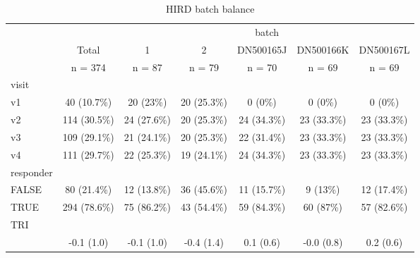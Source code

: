 \begin{table}[ ht ] 
 \centering 
 \caption{HIRD batch balance}\label{tab:hird_batch_balance}
 \begin{tabular}{ l c c c c c c }
 \toprule
  &   &  \multicolumn{ 5 }{c}{ batch }\\ 
   & Total & 1 & 2 & DN500165J & DN500166K & DN500167L \\ 
  & n = 374 & n = 87 & n = 79 & n = 70 & n = 69 & n = 69 \\ 
  \midrule
 visit &   &   &   &   &   &  \\ 
 \hspace{6pt}    v1 & 40 (10.7\%) & 20 (23\%) & 20 (25.3\%) & 0 (0\%) & 0 (0\%) & 0 (0\%)\\ 
 \hspace{6pt}    v2 & 114 (30.5\%) & 24 (27.6\%) & 20 (25.3\%) & 24 (34.3\%) & 23 (33.3\%) & 23 (33.3\%)\\ 
 \hspace{6pt}    v3 & 109 (29.1\%) & 21 (24.1\%) & 20 (25.3\%) & 22 (31.4\%) & 23 (33.3\%) & 23 (33.3\%)\\ 
 \hspace{6pt}    v4 & 111 (29.7\%) & 22 (25.3\%) & 19 (24.1\%) & 24 (34.3\%) & 23 (33.3\%) & 23 (33.3\%)\\ 
 responder &   &   &   &   &   &  \\ 
 \hspace{6pt}    FALSE & 80 (21.4\%) & 12 (13.8\%) & 36 (45.6\%) & 11 (15.7\%) & 9 (13\%) & 12 (17.4\%)\\ 
 \hspace{6pt}    TRUE & 294 (78.6\%) & 75 (86.2\%) & 43 (54.4\%) & 59 (84.3\%) & 60 (87\%) & 57 (82.6\%)\\ 
 TRI &   &   &   &   &   &  \\ 
 \hspace{6pt}   & -0.1 (1.0) & -0.1 (1.0) & -0.4 (1.4) & 0.1 (0.6) & -0.0 (0.8) & 0.2 (0.6)\\ 
 \bottomrule
 
 \end{tabular}
 \end{table}
